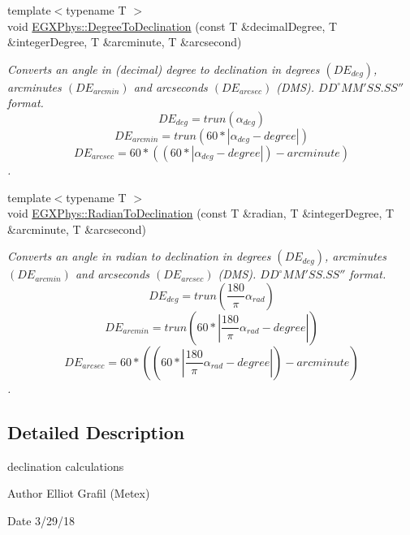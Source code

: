 \begin{DoxyCompactItemize}
{\footnotesize template$<$typename T $>$ }\\void \mbox{\hyperlink{group___e_g_x_phys-_astrophysics-_declination_ga2f4a254231601709112351afad3e504c}{E\+G\+X\+Phys\+::\+Degree\+To\+Declination}} (const T \&decimal\+Degree, T \&integer\+Degree, T \&arcminute, T \&arcsecond)
\begin{DoxyCompactList}\small\item\em Converts an angle in (decimal) degree to declination in degrees $(DE_{deg})$, arcminutes $(DE_{arcmin})$ and arcseconds $(DE_{arcsec})$ (D\+MS). ${DD}^{\circ}{MM}'{SS.SS}''$ format. \[DE_{deg}=trun(\alpha_{deg})\] \[DE_{arcmin}=trun(60 * |\alpha_{deg} - degree|)\] \[DE_{arcsec}=60 * ((60 * |\alpha_{deg} - degree|)-arcminute)\]. \end{DoxyCompactList}\item 
{\footnotesize template$<$typename T $>$ }\\void \mbox{\hyperlink{group___e_g_x_phys-_astrophysics-_declination_gac0f1fab204ea5ae84b6723f857b89318}{E\+G\+X\+Phys\+::\+Radian\+To\+Declination}} (const T \&radian, T \&integer\+Degree, T \&arcminute, T \&arcsecond)
\begin{DoxyCompactList}\small\item\em Converts an angle in radian to declination in degrees $(DE_{deg})$, arcminutes $(DE_{arcmin})$ and arcseconds $(DE_{arcsec})$ (D\+MS). ${DD}^{\circ}{MM}'{SS.SS}''$ format. \[DE_{deg}=trun(\frac{180}{\pi}\alpha_{rad})\] \[DE_{arcmin}=trun(60 * |\frac{180}{\pi}\alpha_{rad} - degree|)\] \[DE_{arcsec}=60 * ((60 * |\frac{180}{\pi}\alpha_{rad} - degree|)-arcminute)\]. \end{DoxyCompactList}\end{DoxyCompactItemize}


\subsection{Detailed Description}
declination calculations 

\begin{DoxyAuthor}{Author}
Elliot Grafil (Metex) 
\end{DoxyAuthor}
\begin{DoxyDate}{Date}
3/29/18 
\end{DoxyDate}
